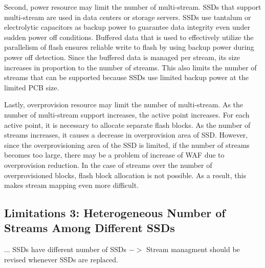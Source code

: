 Second, power resource may limit the number of multi-stream.
SSDs that support multi-stream are used in data centers or storage servers. SSDs use tantalum or electrolytic capacitors as backup power to guarantee data integrity even under sudden power off conditions.
Buffered data that is used to effectively utilize the parallelism of flash ensures reliable write to flash by using backup power during power off detection.
Since the buffered data is managed per stream, its size increases in proportion to the number of streams.
This also limits the number of streams that can be supported because SSDs use limited backup power at the limited PCB size.

Lastly, overprovision resource may limit the number of multi-stream.
As the number of multi-stream support increases, the active point increases. 
For each active point, it is necessary to allocate separate flash blocks.
 As the number of streams increases, it causes a decrease in overprovision area of SSD.
However, since the overprovisioning area of the SSD is limited, if the number of streams becomes too large, there may be a problem of increase of WAF due to overprovision reduction. 
In the case of streams over the number of overprovisioned blocks, flash block allocation  is not possible.
As a result, this makes stream mapping even more difficult.

\subsection{Limitations 3: Heterogeneous Number of Streams Among Different SSDs}
... SSDs have different number of SSDs $->$ Stream managment should be revised whenever SSDs are replaced.
